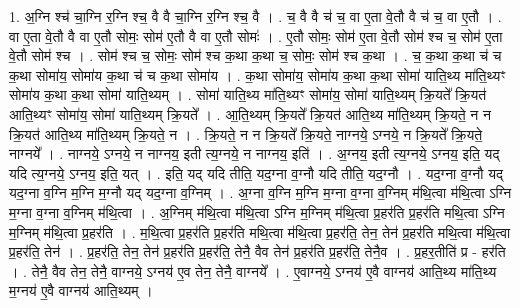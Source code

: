 \documentclass[17pt]{extarticle}
\begin{document}
1. अ॒ग्नि श्च॑ चा॒ग्नि र॒ग्नि श्च॒ वै वै चा॒ग्नि र॒ग्नि श्च॒ वै । . च॒ वै वै च॑ च॒ वा ए॒ता वे॒तौ वै च॑ च॒ वा ए॒तौ । . वा ए॒ता वे॒तौ वै वा ए॒तौ सोमः॒ सोम॑ ए॒तौ वै वा ए॒तौ सोमः॑ । . ए॒तौ सोमः॒ सोम॑ ए॒ता वे॒तौ सोम॑ श्च च॒ सोम॑ ए॒ता वे॒तौ सोम॑ श्च । . सोम॑ श्च च॒ सोमः॒ सोम॑ श्च क॒था क॒था च॒ सोमः॒ सोम॑ श्च क॒था । . च॒ क॒था क॒था च॑ च क॒था सोमा॑य॒ सोमा॑य क॒था च॑ च क॒था सोमा॑य । . क॒था सोमा॑य॒ सोमा॑य क॒था क॒था सोमा॑ याति॒थ्य मा॑ति॒थ्यꣳ सोमा॑य क॒था क॒था सोमा॑ याति॒थ्यम् । . सोमा॑ याति॒थ्य मा॑ति॒थ्यꣳ सोमा॑य॒ सोमा॑ याति॒थ्यम् क्रि॒यते᳚ क्रि॒यत॑ आति॒थ्यꣳ सोमा॑य॒ सोमा॑ याति॒थ्यम् क्रि॒यते᳚ । . आ॒ति॒थ्यम् क्रि॒यते᳚ क्रि॒यत॑ आति॒थ्य मा॑ति॒थ्यम् क्रि॒यते॒ न न क्रि॒यत॑ आति॒थ्य मा॑ति॒थ्यम् क्रि॒यते॒ न । . क्रि॒यते॒ न न क्रि॒यते᳚ क्रि॒यते॒ नाग्नये॒ ऽग्नये॒ न क्रि॒यते᳚ क्रि॒यते॒ नाग्नये᳚ । . नाग्नये॒ ऽग्नये॒ न नाग्नय॒ इती त्य॒ग्नये॒ न नाग्नय॒ इति॑ । . अ॒ग्नय॒ इती त्य॒ग्नये॒ ऽग्नय॒ इति॒ यद् यदि त्य॒ग्नये॒ ऽग्नय॒ इति॒ यत् । . इति॒ यद् यदि तीति॒ यद॒ग्ना व॒ग्नौ यदि तीति॒ यद॒ग्नौ । . यद॒ग्ना व॒ग्नौ यद् यद॒ग्ना व॒ग्नि म॒ग्नि म॒ग्नौ यद् यद॒ग्ना व॒ग्निम् । . अ॒ग्ना व॒ग्नि म॒ग्नि म॒ग्ना व॒ग्ना व॒ग्निम् म॑थि॒त्वा म॑थि॒त्वा ऽग्नि म॒ग्ना व॒ग्ना व॒ग्निम् म॑थि॒त्वा । . अ॒ग्निम् म॑थि॒त्वा म॑थि॒त्वा ऽग्नि म॒ग्निम् म॑थि॒त्वा प्र॒हर॑ति प्र॒हर॑ति मथि॒त्वा ऽग्नि म॒ग्निम् म॑थि॒त्वा प्र॒हर॑ति । . म॒थि॒त्वा प्र॒हर॑ति प्र॒हर॑ति मथि॒त्वा म॑थि॒त्वा प्र॒हर॑ति॒ तेन॒ तेन॑ प्र॒हर॑ति मथि॒त्वा म॑थि॒त्वा प्र॒हर॑ति॒ तेन॑ । . प्र॒हर॑ति॒ तेन॒ तेन॑ प्र॒हर॑ति प्र॒हर॑ति॒ तेनै॒ वैव तेन॑ प्र॒हर॑ति प्र॒हर॑ति॒ तेनै॒व । . प्र॒हर॒तीति॑ प्र - हर॑ति । . तेनै॒ वैव तेन॒ तेनै॒ वाग्नये॒ ऽग्नय॑ ए॒व तेन॒ तेनै॒ वाग्नये᳚ । . ए॒वाग्नये॒ ऽग्नय॑ ए॒वै वाग्नय॑ आति॒थ्य मा॑ति॒थ्य म॒ग्नय॑ ए॒वै वाग्नय॑ आति॒थ्यम् । \newline
\end{document}
